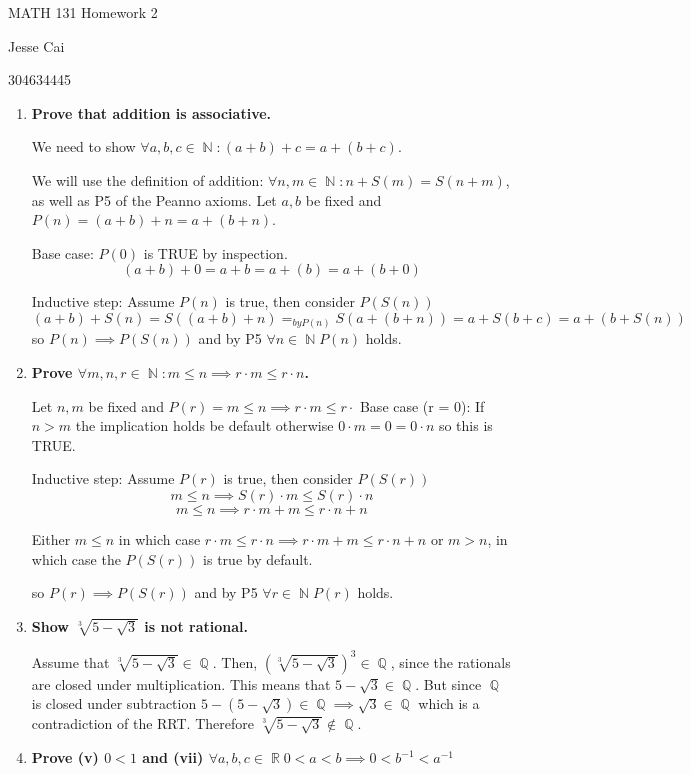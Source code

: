 \documentclass[10pt,a4paper]{article}
\DeclareMathOperator*{\R}{\mathbb{R}}
\DeclareMathOperator*{\Q}{\mathbb{Q}}
\DeclareMathOperator*{\N}{\mathbb{N}}
\begin{document}
MATH 131 Homework 2

Jesse Cai

304634445

\begin{enumerate}
    \item \textbf{Prove that addition is associative.}

        We need to show $\forall a,b,c \in \N:  (a+b)+c = a+(b+c)$. 

        We will use the definition of addition: $\forall n, m \in \N: n+S(m) = S(n+m)$, as well as P5 of the Peanno axioms.
        Let $a,b$ be fixed and $P(n) = (a +b)+n = a+ (b+n)$.

        Base case: $P(0)$ is TRUE by inspection.
        $$(a+b)+0 = a+b = a+(b) = a+(b+0)$$

        Inductive step: Assume $P(n)$ is true, then consider $P(S(n))$
        $$ (a+b) + S(n) = S((a+b)+n) =_{by P(n)} S(a+(b+n))  = a + S(b+c) = a  + (b + S(n))$$
        so $P(n) \implies P(S(n))$ and by P5 $\forall n \in \N P(n)$ holds.


    \item \textbf{Prove $\forall m, n, r\in \N : m \leq n \implies r \cdot m \leq r \cdot n$.}

        Let $n, m$ be fixed and $P(r)  = m \leq n \implies r \cdot m \leq r \cdot $
        Base case (r = 0):
            If $n > m$ the implication holds be default otherwise $0 \cdot m = 0 = 0 \cdot n$ so this is TRUE.

        Inductive step: Assume $P(r)$ is true, then consider $P(S(r))$
        $$m \leq n \implies S(r) \cdot m \leq S(r) \cdot n$$
        $$m \leq n \implies r \cdot m + m \leq r\cdot n + n$$

        Either $m \leq n$ in which case $r \cdot m \leq r\cdot n \implies r \cdot m + m \leq r\cdot n + n$ or $m > n$, in which case the $P(S(r))$ is true by default. 

        so $P(r) \implies P(S(r))$ and by P5 $\forall r \in \N P(r)$ holds.


    \item \textbf{Show $\sqrt[3]{5 - \sqrt3}$ is not rational.}

        Assume that $\sqrt[3]{5 - \sqrt3} \in \Q $.  Then, $\left(\sqrt[3]{5 - \sqrt3}\right)^3 \in \Q$, since the rationals are closed under multiplication.
        This means that $5 - \sqrt3 \in \Q$. But since $\Q$ is closed under subtraction $5 - (5 - \sqrt3) \in \Q \implies \sqrt3 \in \Q$ which is a contradiction of the RRT. Therefore $\sqrt[3]{5 - \sqrt3} \not \in \Q$.
    \item \textbf{Prove (v) $0<1$ and (vii) $\forall a,b, c \in \R 0 < a < b \implies 0 < b^{-1} < a^{-1}$}
    

\end{enumerate}
\end{document}

